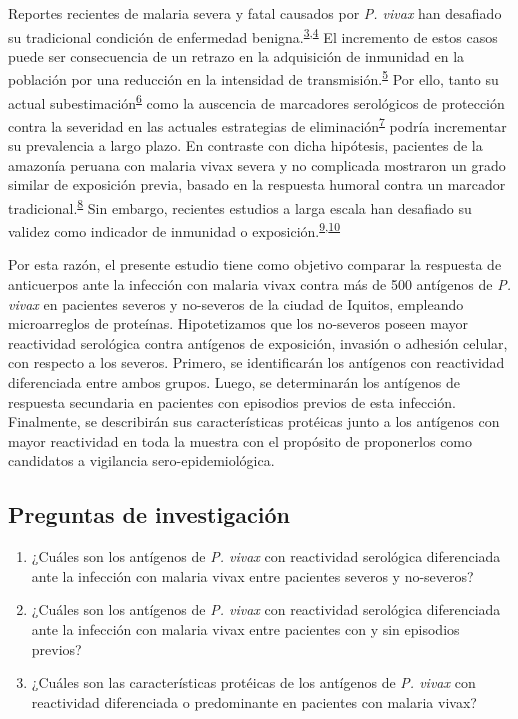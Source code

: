 \documentclass[]{article}
\begin{document}
Reportes recientes de malaria severa y fatal causados por \emph{P.
vivax} han desafiado su tradicional condición de enfermedad
benigna.\textsuperscript{\protect\hyperlink{ref-baird2009}{3},\protect\hyperlink{ref-quispe2014}{4}}
El incremento de estos casos puede ser consecuencia de un retrazo en la
adquisición de inmunidad en la población por una reducción en la
intensidad de
transmisión.\textsuperscript{\protect\hyperlink{ref-reyburn2015}{5}} Por
ello, tanto su actual
subestimación\textsuperscript{\protect\hyperlink{ref-norma2001}{6}} como
la auscencia de marcadores serológicos de protección contra la severidad
en las actuales estrategias de
eliminación\textsuperscript{\protect\hyperlink{ref-accelerate2016}{7}}
podría incrementar su prevalencia a largo plazo. En contraste con dicha
hipótesis, pacientes de la amazonía peruana con malaria vivax severa y
no complicada mostraron un grado similar de exposición previa, basado en
la respuesta humoral contra un marcador
tradicional.\textsuperscript{\protect\hyperlink{ref-baldevi2013}{8}} Sin
embargo, recientes estudios a larga escala han desafiado su validez como
indicador de inmunidad o
exposición.\textsuperscript{\protect\hyperlink{ref-crompton2010}{9},\protect\hyperlink{ref-Helb2015exposure}{10}}

Por esta razón, el presente estudio tiene como objetivo comparar la
respuesta de anticuerpos ante la infección con malaria vivax contra más
de 500 antígenos de \emph{P. vivax} en pacientes severos y no-severos de
la ciudad de Iquitos, empleando microarreglos de proteínas.
Hipotetizamos que los no-severos poseen mayor reactividad serológica
contra antígenos de exposición, invasión o adhesión celular, con
respecto a los severos. Primero, se identificarán los antígenos con
reactividad diferenciada entre ambos grupos. Luego, se determinarán los
antígenos de respuesta secundaria en pacientes con episodios previos de
esta infección. Finalmente, se describirán sus características protéicas
junto a los antígenos con mayor reactividad en toda la muestra con el
propósito de proponerlos como candidatos a vigilancia
sero-epidemiológica.

\subsection{Preguntas de
investigación}\label{preguntas-de-investigacion}

\begin{enumerate}
\def\labelenumi{\arabic{enumi}.}
\item
  ¿Cuáles son los antígenos de \emph{P. vivax} con reactividad
  serológica diferenciada ante la infección con malaria vivax entre
  pacientes severos y no-severos?
\item
  ¿Cuáles son los antígenos de \emph{P. vivax} con reactividad
  serológica diferenciada ante la infección con malaria vivax entre
  pacientes con y sin episodios previos?
\item
  ¿Cuáles son las características protéicas de los antígenos de \emph{P.
  vivax} con reactividad diferenciada o predominante en pacientes con
  malaria vivax?
\end{enumerate}
\end{document}
